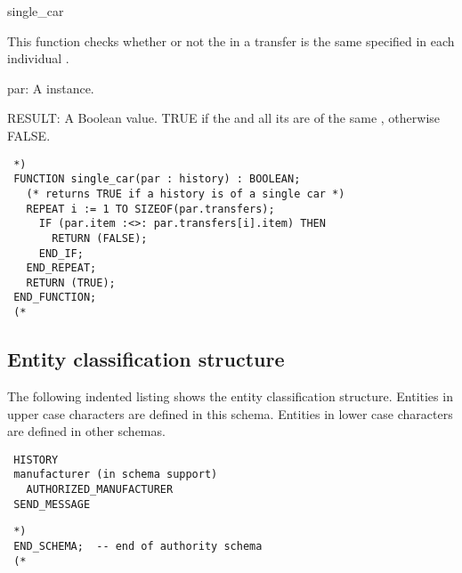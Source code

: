 \documentclass{article}
\begin{document}
 \begin{Mnamedesc}{single_car}
 \begin{Mdesctext}
     This function checks whether or not the  in a transfer
  is the same  specified in each individual
 .
 \end{Mdesctext}

 \begin{Ipars}

 \item[par:] A  instance.

 \item[RESULT:] A Boolean value. TRUE if the  and all its
  are of the same , otherwise FALSE.
 \end{Ipars}

 \begin{Mexp}
 \begin{verbatim}
 *)
 FUNCTION single_car(par : history) : BOOLEAN;
   (* returns TRUE if a history is of a single car *) 
   REPEAT i := 1 TO SIZEOF(par.transfers);
     IF (par.item :<>: par.transfers[i].item) THEN
       RETURN (FALSE);
     END_IF;
   END_REPEAT;
   RETURN (TRUE);
 END_FUNCTION;
 (*
 \end{verbatim}
 \end{Mexp}
 \end{Mnamedesc}

 \subsection{Entity classification structure}

 The following indented listing shows the entity classification structure.
 Entities in upper case characters are defined in this schema. Entities in
 lower case characters are defined in other schemas.

 \begin{small} 
 \begin{verbatim}
 HISTORY
 manufacturer (in schema support)
   AUTHORIZED_MANUFACTURER
 SEND_MESSAGE
 \end{verbatim} 
 \end{small}

 \begin{small} 
 \begin{verbatim}
 *)
 END_SCHEMA;  -- end of authority schema
 (*
 \end{verbatim} 
 \end{small}
\end{document}
